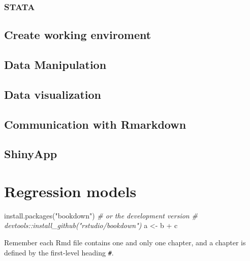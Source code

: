 \documentclass[
]{article}
\newenvironment{Shaded}{\begin{snugshade}}{\end{snugshade}}
\newcommand{\CommentTok}[1]{\textcolor[rgb]{0.56,0.35,0.01}{\textit{#1}}}
\newcommand{\FunctionTok}[1]{\textcolor[rgb]{0.00,0.00,0.00}{#1}}
\newcommand{\NormalTok}[1]{#1}
\newcommand{\OtherTok}[1]{\textcolor[rgb]{0.56,0.35,0.01}{#1}}
\newcommand{\SpecialCharTok}[1]{\textcolor[rgb]{0.00,0.00,0.00}{#1}}
\newcommand{\StringTok}[1]{\textcolor[rgb]{0.31,0.60,0.02}{#1}}
\begin{document}
\hypertarget{stata}{%
\subsubsection{STATA}\label{stata}}

\hypertarget{create-working-enviroment}{%
\subsection{Create working enviroment}\label{create-working-enviroment}}

\hypertarget{data-manipulation}{%
\subsection{Data Manipulation}\label{data-manipulation}}

\hypertarget{data-visualization}{%
\subsection{Data visualization}\label{data-visualization}}

\hypertarget{communication-with-rmarkdown}{%
\subsection{Communication with Rmarkdown}\label{communication-with-rmarkdown}}

\hypertarget{shinyapp}{%
\subsection{ShinyApp}\label{shinyapp}}

\hypertarget{regression-models}{%
\section{Regression models}\label{regression-models}}

\begin{Shaded}
\begin{Highlighting}[]
\FunctionTok{install.packages}\NormalTok{(}\StringTok{"bookdown"}\NormalTok{)}
\CommentTok{\# or the development version}
\CommentTok{\# devtools::install\_github("rstudio/bookdown")}
\NormalTok{a }\OtherTok{\textless{}{-}}\NormalTok{ b }\SpecialCharTok{+}\NormalTok{ c}
\end{Highlighting}
\end{Shaded}

Remember each Rmd file contains one and only one chapter, and a chapter is defined by the first-level heading \texttt{\#}.
\end{document}
